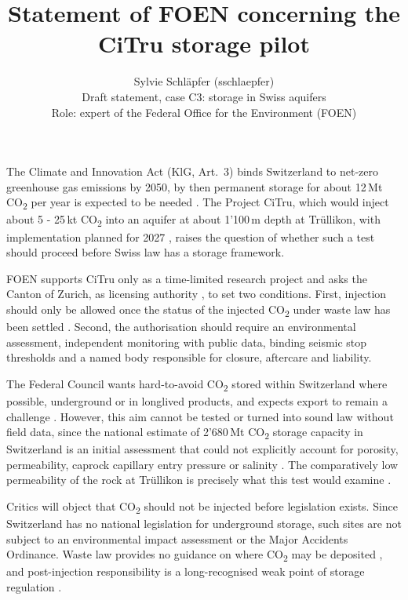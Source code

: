 \documentclass[11pt,a4paper]{article}
\title{Statement of FOEN concerning the CiTru \COtwo{} storage pilot}
\author{Sylvie Schläpfer (sschlaepfer)\\[0.5ex]
  \small Draft statement, case C3: \COtwo{} storage in Swiss aquifers\\
  \small Role: expert of the Federal Office for the Environment (FOEN)}
\date{}
\newcommand{\COtwo}{CO\textsubscript{2}}
\begin{document}
\maketitle

The Climate and Innovation Act (KlG, Art.~3) binds Switzerland to net-zero greenhouse gas emissions by 2050, by then permanent storage for about 12\,Mt \COtwo{} per year is expected to be needed \cites{KlG}[p.~2]{FOEN2025Factsheet}{FOEN2025Legislation}.
The Project CiTru, which would inject about 5 - 25\,kt \COtwo{} into an aquifer at about 1'100\,m depth at Trüllikon, with implementation planned for 2027 \cites{GruberBrunner2026}{4401_2026}, raises the question of whether such a test should proceed before Swiss law has a storage framework.

FOEN supports CiTru only as a time-limited research project and asks the Canton of Zurich, as licensing authority \cite[p.~6]{FOEN2025Factsheet}, to set two conditions. First, injection should only be allowed once the status of the injected \COtwo{} under waste law has been settled \cites[p.~5]{FOEN2025Factsheet}[p.~73]{Affolter2024}. Second, the authorisation should require an environmental assessment, independent monitoring with public data, binding seismic stop thresholds and a named body responsible for closure, aftercare and liability.

The Federal Council wants hard-to-avoid \COtwo{} stored within Switzerland  where possible, underground or in
longlived products, and expects export to remain a challenge
\cite{Brupbacher2024}. However, this aim cannot be tested or turned into sound law
without field data, since the national estimate of 2'680\,Mt \COtwo{} storage capacity in Switzerland is an initial assessment that could not explicitly account for porosity, permeability, caprock
capillary entry pressure or salinity \cite[pp.~427, 452]{Chevalier2010}. The comparatively low permeability of the rock at Trüllikon is precisely what this test would examine \cite{Brupbacher2024}.

Critics will object that \COtwo{} should not be injected before legislation exists. Since Switzerland has no national legislation for underground storage, such
sites are not subject to an environmental impact assessment or the Major Accidents Ordinance. Waste law provides no guidance on where \COtwo{} may be deposited \cites[pp.~5--6]{FOEN2025Factsheet}[p.~109]{Affolter2024}, and
post-injection responsibility is a long-recognised weak point of storage
regulation \cite[pp.~255--257]{Benson2005}.
\end{document}
